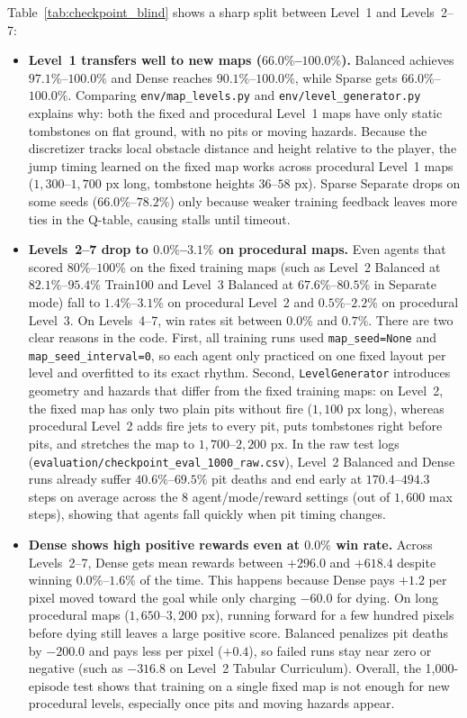 Table~\ref{tab:checkpoint_blind} shows a sharp split between Level~1 and Levels~2--7:
\begin{itemize}
    \item \textbf{Level~1 transfers well to new maps ($66.0\%$--$100.0\%$).} Balanced achieves $97.1\%$--$100.0\%$ and Dense reaches $90.1\%$--$100.0\%$, while Sparse gets $66.0\%$--$100.0\%$. Comparing \texttt{env/map\_levels.py} and \texttt{env/level\_generator.py} explains why: both the fixed and procedural Level~1 maps have only static tombstones on flat ground, with no pits or moving hazards. Because the discretizer tracks local obstacle distance and height relative to the player, the jump timing learned on the fixed map works across procedural Level~1 maps ($1{,}300$--$1{,}700\text{ px}$ long, tombstone heights $36$--$58\text{ px}$). Sparse Separate drops on some seeds ($66.0\%$--$78.2\%$) only because weaker training feedback leaves more ties in the Q-table, causing stalls until timeout.
    \item \textbf{Levels~2--7 drop to $0.0\%$--$3.1\%$ on procedural maps.} Even agents that scored $80\%$--$100\%$ on the fixed training maps (such as Level~2 Balanced at $82.1\%$--$95.4\%$ Train100 and Level~3 Balanced at $67.6\%$--$80.5\%$ in Separate mode) fall to $1.4\%$--$3.1\%$ on procedural Level~2 and $0.5\%$--$2.2\%$ on procedural Level~3. On Levels~4--7, win rates sit between $0.0\%$ and $0.7\%$. There are two clear reasons in the code. First, all training runs used \texttt{map\_seed=None} and \texttt{map\_seed\_interval=0}, so each agent only practiced on one fixed layout per level and overfitted to its exact rhythm. Second, \texttt{LevelGenerator} introduces geometry and hazards that differ from the fixed training maps: on Level~2, the fixed map has only two plain pits without fire ($1{,}100\text{ px}$ long), whereas procedural Level~2 adds fire jets to every pit, puts tombstones right before pits, and stretches the map to $1{,}700$--$2{,}200\text{ px}$. In the raw test logs (\texttt{evaluation/checkpoint\_eval\_1000\_raw.csv}), Level~2 Balanced and Dense runs already suffer $40.6\%$--$69.5\%$ pit deaths and end early at $170.4$--$494.3$ steps on average across the 8 agent/mode/reward settings (out of $1{,}600$ max steps), showing that agents fall quickly when pit timing changes.
    \item \textbf{Dense shows high positive rewards even at $0.0\%$ win rate.} Across Levels~2--7, Dense gets mean rewards between $+296.0$ and $+618.4$ despite winning $0.0\%$--$1.6\%$ of the time. This happens because Dense pays $+1.2$ per pixel moved toward the goal while only charging $-60.0$ for dying. On long procedural maps ($1{,}650$--$3{,}200\text{ px}$), running forward for a few hundred pixels before dying still leaves a large positive score. Balanced penalizes pit deaths by $-200.0$ and pays less per pixel ($+0.4$), so failed runs stay near zero or negative (such as $-316.8$ on Level~2 Tabular Curriculum). Overall, the 1,000-episode test shows that training on a single fixed map is not enough for new procedural levels, especially once pits and moving hazards appear.
\end{itemize}

